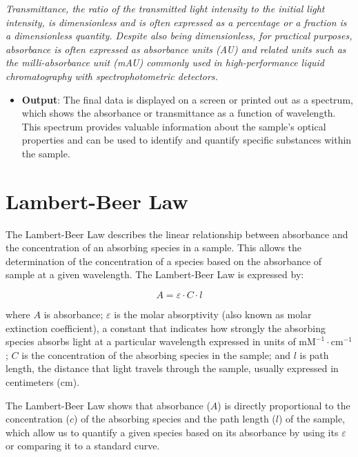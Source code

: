 \documentclass[
  9pt,
  american,
  a5paper,
  extrafontsizes,onecolumn,openright
  ]{memoir}
\providecommand{\tightlist}{%
  \setlength{\itemsep}{0pt}\setlength{\parskip}{0pt}}
\newlength{\rf}
\begin{document}
\begin{greybox}[frametitle = Note]
\emph{Transmittance, the ratio of the transmitted light intensity to the initial light intensity, is dimensionless and is often expressed as a percentage or a fraction is a dimensionless quantity. Despite also being dimensionless, for practical purposes, absorbance is often expressed as absorbance units (AU) and related units such as the milli-absorbance unit (mAU) commonly used in high-performance liquid chromatography with spectrophotometric detectors.}

\end{greybox}

\begin{itemize}
\tightlist
\item
  \textbf{Output}: The final data is displayed on a screen or printed out as a spectrum, which shows the absorbance or transmittance as a function of wavelength. This spectrum provides valuable information about the sample's optical properties and can be used to identify and quantify specific substances within the sample.
\end{itemize}

\section{Lambert-Beer Law}\label{lambert-beer-law}

The Lambert-Beer Law describes the linear relationship between absorbance and the concentration of an absorbing species in a sample. This allows the determination of the concentration of a species based on the absorbance of sample at a given wavelength. The Lambert-Beer Law is expressed by:

\[ A = \varepsilon \cdot C \cdot l \]

where \(A\) is absorbance; \(\varepsilon\) is the molar absorptivity (also known as molar extinction coefficient), a constant that indicates how strongly the absorbing species absorbs light at a particular wavelength expressed in units of \(\text{mM}^{-1} \cdot \text{cm}^{-1}\); \(C\) is the concentration of the absorbing species in the sample; and \(l\) is path length, the distance that light travels through the sample, usually expressed in centimeters (cm).

The Lambert-Beer Law shows that absorbance (\(A\)) is directly proportional to the concentration (\(c\)) of the absorbing species and the path length (\(l\)) of the sample, which allow us to quantify a given species based on its absorbance by using its \(\varepsilon\) or comparing it to a standard curve.
\end{document}
